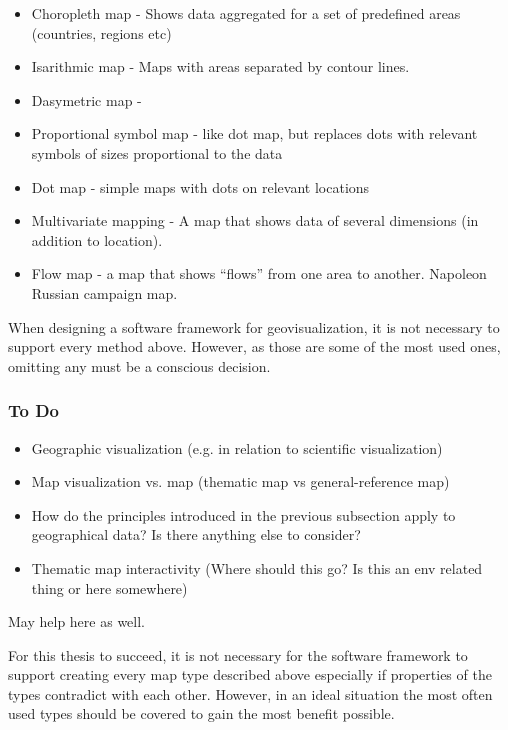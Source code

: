 \begin{itemize}
	\item Choropleth map - Shows data aggregated for a set of predefined areas (countries, regions etc)
	\item Isarithmic map - Maps with areas separated by contour lines.
	\item Dasymetric map - 
	\item Proportional symbol map - like dot map, but replaces dots with relevant symbols of sizes proportional to the data
	\item Dot map - simple maps with dots on relevant locations
	\item Multivariate mapping - A map that shows data of several dimensions (in addition to location).
	\item Flow map - a map that shows ``flows'' from one area to another. Napoleon Russian campaign map.
\end{itemize}

When designing a software framework for geovisualization, it is not necessary to support every method above. However, as those are some of the most used ones, omitting any must be a conscious decision.


\subsubsection{To Do}
\begin{itemize}
	\item Geographic visualization (e.g. in relation to scientific visualization)
	\item Map visualization vs. map (thematic map vs general-reference map) \citep{bartz_petchenik_place_1979}
	\item How do the principles introduced in the previous subsection apply to geographical data? Is there anything else to consider?
	\item Thematic map interactivity \citep{andrienko_interactive_1999} (Where should this go? Is this an env related thing or here somewhere)
\end{itemize}

\citet[p.~16]{tufte_visual_1986} May help here as well.

For this thesis to succeed, it is not necessary for the software framework to support creating every map type described above especially if properties of the types contradict with each other. However, in an ideal situation the most often used types should be covered to gain the most benefit possible. 

